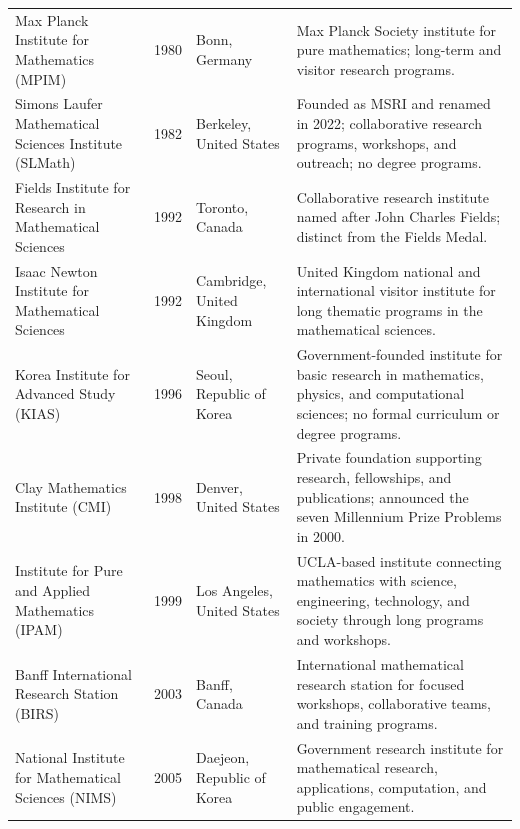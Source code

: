 {\begin{longtable}{@{}L{0.24\textwidth}L{0.10\textwidth}L{0.20\textwidth}L{0.38\textwidth}@{}}
        Max Planck Institute for Mathematics (MPIM)
        & 1980
        & Bonn, Germany
        & Max Planck Society institute for pure mathematics; long-term and
          visitor research programs. \\

        Simons Laufer Mathematical Sciences Institute (SLMath)
        & 1982
        & Berkeley, United States
        & Founded as MSRI and renamed in 2022; collaborative research programs,
          workshops, and outreach; no degree programs. \\

        Fields Institute for Research in Mathematical Sciences
        & 1992
        & Toronto, Canada
        & Collaborative research institute named after John Charles Fields;
          distinct from the Fields Medal. \\

        Isaac Newton Institute for Mathematical Sciences
        & 1992
        & Cambridge, United Kingdom
        & United Kingdom national and international visitor institute for long thematic
          programs in the mathematical sciences. \\

        Korea Institute for Advanced Study (KIAS)
        & 1996
        & Seoul, Republic of Korea
        & Government-founded institute for basic research in mathematics,
          physics, and computational sciences; no formal curriculum or degree
          programs. \\

        Clay Mathematics Institute (CMI)
        & 1998
        & Denver, United States
        & Private foundation supporting research, fellowships, and
          publications; announced the seven Millennium Prize Problems in 2000. \\

        Institute for Pure and Applied Mathematics (IPAM)
        & 1999
        & Los Angeles, United States
        & UCLA-based institute connecting mathematics with science,
          engineering, technology, and society through long programs and
          workshops. \\

        Banff International Research Station (BIRS)
        & 2003
        & Banff, Canada
        & International mathematical research station for focused workshops,
          collaborative teams, and training programs. \\

        National Institute for Mathematical Sciences (NIMS)
        & 2005
        & Daejeon, Republic of Korea
        & Government research institute for mathematical research,
          applications, computation, and public engagement. \\


\end{longtable}}
